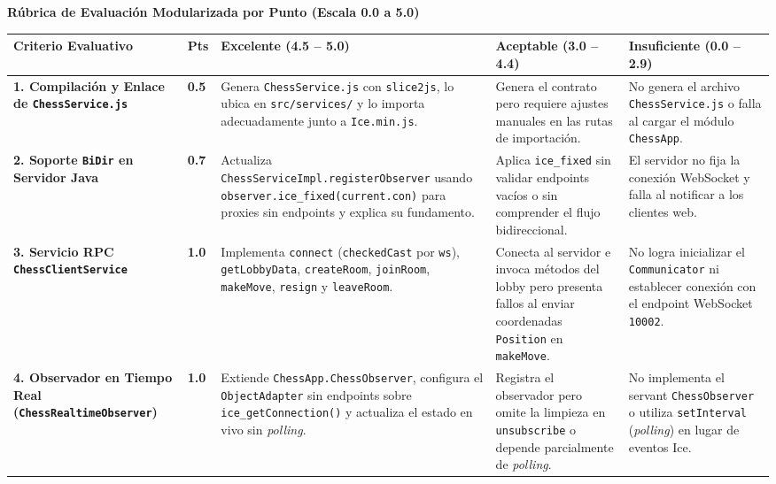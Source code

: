 \documentclass[10pt,letterpaper]{article}
\renewcommand{\arraystretch}{1.25}
\newcommand{\sectionBadge}[1]{%
  \refstepcounter{section}%
  \vspace{0.24cm}%
  \noindent%
  \colorbox{icesiBlue}{\color{white}\rule[-0.08cm]{0pt}{0.42cm}\hspace{0.16cm}\textbf{\normalsize \thesection}\hspace{0.16cm}}%
  \hspace{0.18cm}%
  {\fontsize{9.5}{12}\selectfont\textbf{\color{icesiDark}#1}}\\[-0.10cm]%
  \noindent{\color{icesiDark}\rule{\textwidth}{0.8pt}}\vspace{0.10cm}%
}
\begin{document}
\sectionBadge{Rúbrica de Evaluación Modularizada por Punto (Escala 0.0 a 5.0)}

\vspace{0.06cm}
\noindent
\setlength{\tabcolsep}{3.2pt}
\fontsize{7.2}{9.2}\selectfont
\renewcommand{\arraystretch}{1.18}
\begin{tabularx}{\textwidth}{|L{2.5cm}|C{0.5cm}|X|X|X|}
\hline
{}
\textbf{Criterio Evaluativo} & \textbf{Pts} & \textbf{Excelente (4.5 -- 5.0)} & \textbf{Aceptable (3.0 -- 4.4)} & \textbf{Insuficiente (0.0 -- 2.9)} \\ \hline

\textbf{1. Compilación y Enlace de \texttt{ChessService.js}} & \textbf{0.5} &
Genera \texttt{ChessService.js} con \texttt{slice2js}, lo ubica en \texttt{src/services/} y lo importa adecuadamente junto a \texttt{Ice.min.js}. &
Genera el contrato pero requiere ajustes manuales en las rutas de importación. &
No genera el archivo \texttt{ChessService.js} o falla al cargar el módulo \texttt{ChessApp}. \\ \hline

\textbf{2. Soporte \texttt{BiDir} en Servidor Java} & \textbf{0.7} &
Actualiza \texttt{ChessServiceImpl.registerObserver} usando \texttt{observer.ice\_fixed(current.con)} para proxies sin endpoints y explica su fundamento. &
Aplica \texttt{ice\_fixed} sin validar endpoints vacíos o sin comprender el flujo bidireccional. &
El servidor no fija la conexión WebSocket y falla al notificar a los clientes web. \\ \hline

\textbf{3. Servicio RPC \texttt{ChessClientService}} & \textbf{1.0} &
Implementa \texttt{connect} (\texttt{checkedCast} por \texttt{ws}), \texttt{getLobbyData}, \texttt{createRoom}, \texttt{joinRoom}, \texttt{makeMove}, \texttt{resign} y \texttt{leaveRoom}. &
Conecta al servidor e invoca métodos del lobby pero presenta fallos al enviar coordenadas \texttt{Position} en \texttt{makeMove}. &
No logra inicializar el \texttt{Communicator} ni establecer conexión con el endpoint WebSocket \texttt{10002}. \\ \hline

\textbf{4. Observador en Tiempo Real (\texttt{ChessRealtimeObserver})} & \textbf{1.0} &
Extiende \texttt{ChessApp.ChessObserver}, configura el \texttt{ObjectAdapter} sin endpoints sobre \texttt{ice\_getConnection()} y actualiza el estado en vivo sin \textit{polling}. &
Registra el observador pero omite la limpieza en \texttt{unsubscribe} o depende parcialmente de \textit{polling}. &
No implementa el servant \texttt{ChessObserver} o utiliza \texttt{setInterval} (\textit{polling}) en lugar de eventos Ice. \\ \hline


\end{tabularx}
\end{document}
